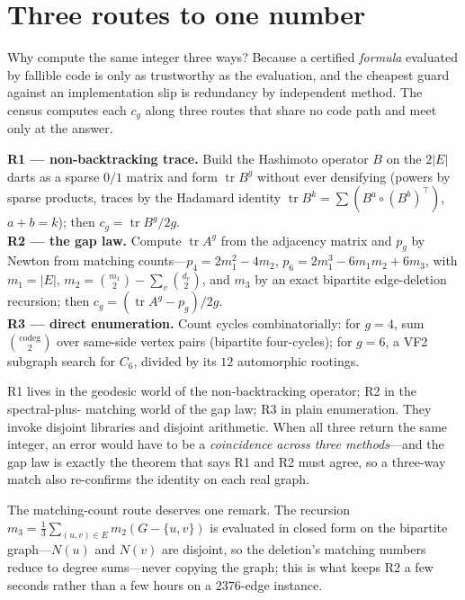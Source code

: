 \documentclass[11pt]{article}
\DeclareMathOperator{\tr}{tr}
\begin{document}
\section{Three routes to one number}
\label{sec:routes}

Why compute the same integer three ways? Because a certified \emph{formula} evaluated by
fallible code is only as trustworthy as the evaluation, and the cheapest guard against an
implementation slip is redundancy by independent method. The census computes each $c_g$ along
three routes that share no code path and meet only at the answer.

\begin{tcolorbox}[colframe=ggteal!70,colback=ggband!20,arc=3pt,boxrule=0.8pt,
  title=\textbf{The three routes (mutually independent)}, coltitle=white,colbacktitle=ggteal]
\textbf{R1 --- non-backtracking trace.} Build the Hashimoto operator $B$ on the $2|E|$ darts
as a sparse $0/1$ matrix and form $\tr B^g$ without ever densifying (powers by sparse
products, traces by the Hadamard identity $\tr B^k = \sum (B^a \circ (B^b)^{\!\top})$,
$a+b=k$); then $c_g = \tr B^g / 2g$.\\[2pt]
\textbf{R2 --- the gap law.} Compute $\tr A^g$ from the adjacency matrix and $p_g$ by Newton
from matching counts---$p_4 = 2m_1^2 - 4m_2$, $p_6 = 2m_1^3 - 6m_1m_2 + 6m_3$, with $m_1 =
|E|$, $m_2 = \binom{m_1}{2} - \sum_v \binom{d_v}{2}$, and $m_3$ by an exact bipartite
edge-deletion recursion; then $c_g = (\tr A^g - p_g)/2g$.\\[2pt]
\textbf{R3 --- direct enumeration.} Count cycles combinatorially: for $g = 4$, sum
$\binom{\text{codeg}}{2}$ over same-side vertex pairs (bipartite four-cycles); for $g = 6$, a
VF2 subgraph search for $C_6$, divided by its $12$ automorphic rootings.
\end{tcolorbox}

R1 lives in the geodesic world of the non-backtracking operator; R2 in the spectral-plus-
matching world of the gap law; R3 in plain enumeration. They invoke disjoint libraries and
disjoint arithmetic. When all three return the same integer, an error would have to be a
\emph{coincidence across three methods}---and the gap law is exactly the theorem that says R1
and R2 must agree, so a three-way match also re-confirms the identity on each real graph.

The matching-count route deserves one remark. The recursion $m_3 = \tfrac13 \sum_{(u,v)\in E}
m_2(G - \{u,v\})$ is evaluated in closed form on the bipartite graph---$N(u)$ and $N(v)$ are
disjoint, so the deletion's matching numbers reduce to degree sums---never copying the graph;
this is what keeps R2 a few seconds rather than a few hours on a $2376$-edge instance.
\end{document}
